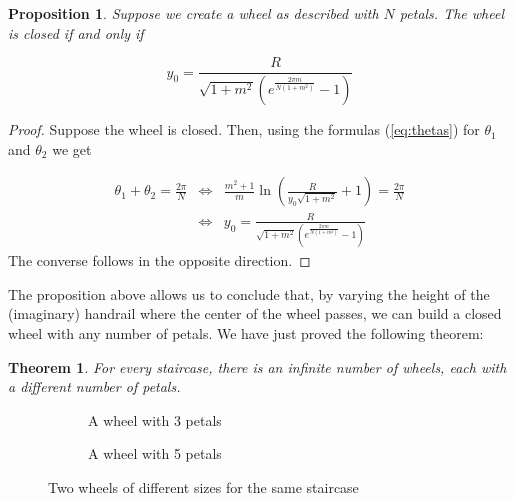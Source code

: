 \documentclass{article}
\theoremstyle{theorem}
\newtheorem{prop}{Proposition}[section]
\theoremstyle{theorem}
\newtheorem{thm}{Theorem}[section]
\begin{document}
\begin{prop}
  Suppose we create a wheel as described with $N$ petals. The wheel is
  closed if and only if

  \begin{equation}
    \label{eq:y0}
    y_0=\frac{R}{\sqrt{1+m^2}\left(e^{\frac{2\pi m}{N(1+m^2)}}-1\right)}
  \end{equation}

\end{prop}

\begin{proof}
  Suppose the wheel is closed. Then, using the formulas
  (\ref{eq:thetas}) for $\theta_1$ and $\theta_2$ we get

  \begin{equation}
    \begin{array}{lcl}
      \theta_1+\theta_2=\frac{2\pi}{N} & \Leftrightarrow &
      \frac{m^2+1}{m}
      \ln\left(\frac{R}{y_0\sqrt{1+m^2}}+1\right)=\frac{2\pi}{N} \\
      & \Leftrightarrow
      & y_0=\frac{R}{\sqrt{1+m^2}\left(e^{\frac{2\pi
              m}{N(1+m^2)}}-1\right)}
    \end{array}
  \end{equation}
The converse follows in the opposite direction.
\end{proof}

The proposition above allows us to conclude that, by varying the
height of the (imaginary) handrail where the center of the wheel
passes, we can build a closed wheel with any number of petals. We have
just proved the following theorem:

\begin{thm}
For every staircase, there is an infinite number of wheels, each with
a different number of petals.
\end{thm}

\begin{figure}[h]
\centering
\begin{subfigure}[t]{.45\textwidth}
  \centering
  
  \caption{A wheel with 3 petals}
  \label{fig:wheel4}
\end{subfigure}
\begin{subfigure}[t]{.45\textwidth}
  \centering
  
  \caption{A wheel with 5 petals}
  \label{fig:wheel5}
\end{subfigure}
\caption{Two wheels of different sizes for the same staircase}
\label{fig:wheels}
\end{figure}
\end{document}
